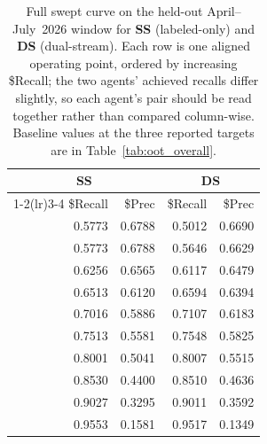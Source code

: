 \documentclass[11pt]{article}
\begin{document}
\begin{table}[!ht]
\centering\small
\setlength{\tabcolsep}{7pt}
\caption{Full swept curve on the held-out April--July~2026 window for \textbf{SS} (labeled-only)
and \textbf{DS} (dual-stream). Each row is one aligned operating point, ordered by increasing
\$Recall; the two agents' achieved recalls differ slightly, so each agent's pair should be read
together rather than compared column-wise. Baseline values at the three reported targets are in
Table~\ref{tab:oot_overall}.}
\label{tab:app_curve}
\begin{tabular}{rr@{\hskip 12pt}rr}
\toprule
\multicolumn{2}{c}{SS} & \multicolumn{2}{c}{\textbf{DS}} \\
\cmidrule(lr){1-2}\cmidrule(lr){3-4}
\$Recall & \$Prec & \$Recall & \$Prec \\
\midrule
0.5773 & 0.6788 & 0.5012 & 0.6690 \\
0.5773 & 0.6788 & 0.5646 & 0.6629 \\
0.6256 & 0.6565 & 0.6117 & 0.6479 \\
0.6513 & 0.6120 & 0.6594 & 0.6394 \\
0.7016 & 0.5886 & 0.7107 & 0.6183 \\
0.7513 & 0.5581 & 0.7548 & 0.5825 \\
0.8001 & 0.5041 & 0.8007 & 0.5515 \\
0.8530 & 0.4400 & 0.8510 & 0.4636 \\
0.9027 & 0.3295 & 0.9011 & 0.3592 \\
0.9553 & 0.1581 & 0.9517 & 0.1349 \\
\bottomrule
\end{tabular}
\end{table}
\end{document}
